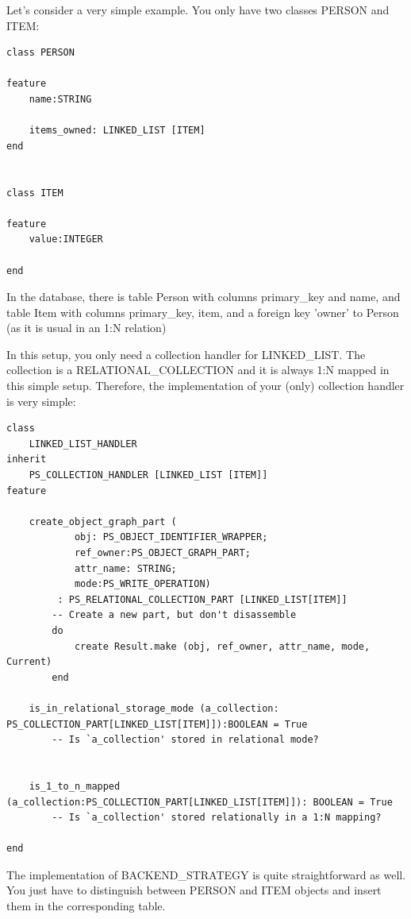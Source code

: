 Let's consider a very simple example. You only have two classes PERSON and ITEM:

\begin{lstlisting}[language=OOSC2Eiffel, captionpos=b, caption={Application classes}, label={lst:example_application}]
class PERSON

feature
	name:STRING

	items_owned: LINKED_LIST [ITEM]
end


class ITEM

feature
	value:INTEGER

end
\end{lstlisting}

In the database, there is table Person with columns primary\_key and name, and table Item with columns primary\_key, item, and a foreign key 'owner' to Person (as it is usual in an 1:N relation)


In this setup, you only need a collection handler for LINKED\_LIST.
The collection is a RELATIONAL\_COLLECTION and it is always 1:N mapped in this simple setup.
Therefore, the implementation of your (only) collection handler is very simple:

\begin{lstlisting}[language=OOSC2Eiffel, captionpos=b, caption={The collection handler for LINKED\_LIST}, label={lst:my_linked_list_collection_handler}]
class 
	LINKED_LIST_HANDLER
inherit
	PS_COLLECTION_HANDLER [LINKED_LIST [ITEM]]
feature

	create_object_graph_part (
			obj: PS_OBJECT_IDENTIFIER_WRAPPER;
			ref_owner:PS_OBJECT_GRAPH_PART; 
			attr_name: STRING;
			mode:PS_WRITE_OPERATION)
		 : PS_RELATIONAL_COLLECTION_PART [LINKED_LIST[ITEM]]
		-- Create a new part, but don't disassemble
		do
			create Result.make (obj, ref_owner, attr_name, mode, Current)
		end

	is_in_relational_storage_mode (a_collection: PS_COLLECTION_PART[LINKED_LIST[ITEM]]):BOOLEAN = True
		-- Is `a_collection' stored in relational mode?


	is_1_to_n_mapped (a_collection:PS_COLLECTION_PART[LINKED_LIST[ITEM]]): BOOLEAN = True
		-- Is `a_collection' stored relationally in a 1:N mapping?

end
\end{lstlisting}


The implementation of BACKEND\_STRATEGY is quite straightforward as well.
You just have to distinguish between PERSON and ITEM objects and insert them in the corresponding table.

